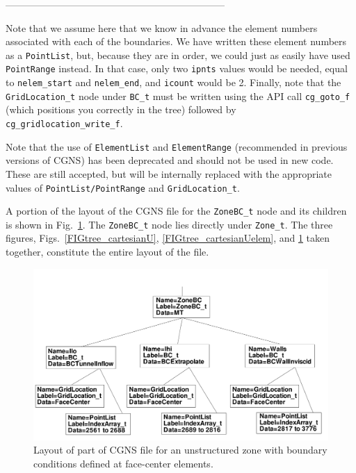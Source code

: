 \documentclass[12pt]{article}
\begin{document}
--------------------------------------------------------------------

Note that we assume here that we know in advance the element numbers
associated with each of the boundaries.  We have written these element
numbers as a {\tt PointList}, but, because they are in order, we could
just as easily have used {\tt PointRange} instead.
In that case, only two {\tt ipnts} values would be needed, equal to
{\tt nelem\_start} and {\tt nelem\_end}, and {\tt icount} would be 2.
Finally, note that
the {\tt GridLocation\_t} node under {\tt BC\_t} must be written using
the API call {\tt cg\_goto\_f} (which positions you
correctly in the tree) followed by {\tt cg\_gridlocation\_write\_f}.

Note that the use of {\tt ElementList} and {\tt ElementRange} (recommended in
previous versions of CGNS) has been 
deprecated and should not be used in new code. 
These are still accepted, but will be internally replaced with the 
appropriate values of {\tt PointList/PointRange} and {\tt GridLocation\_t}.

A portion of the layout of the CGNS file for the {\tt ZoneBC\_t}
node and its children is shown in Fig.~\ref{FIGtree_cartesian_UBC}.  The {\tt ZoneBC\_t}
node lies directly under {\tt Zone\_t}.  The three figures,
Figs.~\ref{FIGtree_cartesianU}, \ref{FIGtree_cartesianUelem}, and
\ref{FIGtree_cartesian_UBC} taken together, constitute the entire layout of
the file.

\begin{figure}[hpbt]
\centerline{{\includegraphics[width=150mm]{figures/tree_cartesian_UBC}}}
\caption{Layout of part of CGNS file for an unstructured zone with
boundary conditions defined at face-center elements.}
\label{FIGtree_cartesian_UBC}
\end{figure}
%
\end{document}
